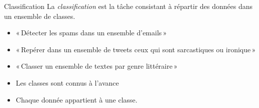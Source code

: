 \documentclass[hyperref={unicode}, xcolor={svgnames}, french]{beamer}
\begin{document}
\begin{frame}[label=classif,fragile]{Classification}
    La \emph{classification} est la tâche consistant à \alert{répartir} des données dans un ensemble de classes.
    \begin{itemize}
        \item « Détecter les spams dans un ensemble d'emails »
        \item « Repérer dans un ensemble de tweets ceux qui sont sarcastiques ou ironique »
        \item « Classer un ensemble de textes par genre littéraire »
    \end{itemize}
    \begin{figure}
        \tikzset{external/export=true}
    \end{figure}
    \begin{itemize}
        \item Les \textcolor{highlight8}{classes} sont connus à l'avance
        \item Chaque \textcolor{highlight4}{donnée} appartient à une classe.
    \end{itemize}
\end{frame}
\end{document}
